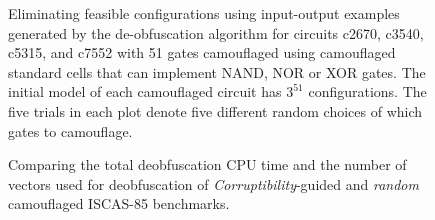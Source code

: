\documentclass[thesis]{umassthesis}  %
\begin{document}
\begin{figure}[!hbt]
  \centering
  {
        \vspace{-2mm}
    
    }
    \vspace{-2mm}
    
    \caption{Eliminating feasible configurations using input-output examples generated by the de-obfuscation algorithm for circuits c2670, c3540, c5315, and c7552 with 51 gates camouflaged using camouflaged standard cells that can implement NAND, NOR or XOR gates. The initial model of each camouflaged circuit has $3^{51}$ configurations. The five trials in each plot denote five different random choices of which gates to camouflage.}
    \vspace{-2mm}
    \label{fig:c7552_coverage}
\end{figure}




    \begin{figure}[!ht]
  \centering
    \hspace{20pt}
    \caption{Comparing the total deobfuscation CPU time and the number of vectors used for deobfuscation of \textit{Corruptibility}-guided and \textit{random} camouflaged ISCAS-85 benchmarks.}
    \vspace{-2mm}
    \label{fig:comparison_corrupt_random}
  \end{figure}
\end{document}

